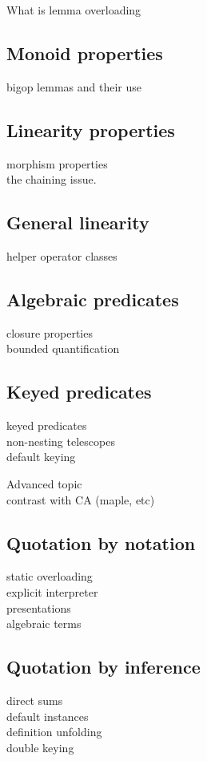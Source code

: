 What is lemma overloading

\subsection{Monoid properties}

bigop lemmas and their use

\subsection{Linearity properties}

morphism properties\\
the chaining issue.

\subsection{General linearity}

helper operator classes

\subsection{Algebraic predicates}

closure properties\\
bounded quantification

\subsection{Keyed predicates}

keyed predicates\\
non-nesting telescopes\\
default keying


Advanced topic\\
contrast with CA (maple, etc)

\subsection{Quotation by notation}

static overloading\\
explicit interpreter\\
presentations\\
algebraic terms

\subsection{Quotation by inference}

direct sums\\
default instances\\
definition unfolding\\
double keying


